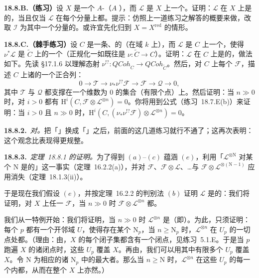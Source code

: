 \textbf{18.8.B.（练习）}\quad 设 $X$ 是一个\trProper{} $A$-\trScheme（$A$ \trNoetherian），而 $\mathscr{L}$ 是 $X$ 上一个\trInvertibleSheaf。证明：$\mathscr{L}$ 在 $X$ 上是\trAmple{}的，当且仅当 $\mathscr{L}$ 在每个分量上都\trAmple。提示：仿照上一道练习之解答的概要来做，改取 $\mathscr{I}$ 为其中一个分量的\trIdealSheaf。或许宜先化归到 $X=X^{\mathrm{red}}$ 的情形。

\textbf{18.8.C.（棘手练习）}\quad 设 $C$ 是一条\trProper{}、\emph{\trReduced}的\trCurve（在域 $k$ 上），而 $\mathscr{L}$ 是 $C$ 上一个\trLineBundle，使得 $\nu^*\mathscr{L}$ 是 $\widetilde{C}$ 上的一个\trAmple{}\trLineBundle（正规化一如既往是 $\nu\colon\widetilde{C}\to C$）。证明：$\mathscr{L}$ 在 $C$ 上是\trAmple{}的，做法如下。先读 \S17.1.6 以理解态射 $\nu^{!?}\colon\mathit{QCoh}_C\to\mathit{QCoh}_{\widetilde{C}}$。然后，对 $C$ 上每个\trQCSheaf{} $\mathscr{F}$，描述 $C$ 上诸\trQCSheaf{}的一个正合列：
\[
0\longrightarrow\mathscr{T}\longrightarrow\nu_*\nu^{!?}\mathscr{F}\longrightarrow\mathscr{F}\longrightarrow\mathscr{Q}\longrightarrow 0,
\]
其中 $\mathscr{T}$ 与 $\mathscr{Q}$ 都支撑在一个维数为 $0$ 的集合（有限个点）上。然后证明：当 $n\gg 0$ 时，对 $i>0$ 都有 $\mathrm{H}^i(C,\mathscr{F}\otimes\mathscr{L}^{\otimes n})=0$。你将用到\trProjection{}公式（\mbox{练习~18.7.E(b)}）来证明：当 $i>0$ 且 $n\gg 0$ 时，$\mathrm{H}^i(C,(\nu_*\nu^{!?}\mathscr{F})\otimes\mathscr{L}^{\otimes n})=0$。

\textbf{18.8.2.}\ \emph{\trVeryAmple{}对\trAmple。}\quad 把「\trAmple」换成「\trVeryAmple」之后，前面的这几道练习就行不通了；这再次表明：\trAmpleness{}这个观念比\trVeryAmpleness{}表现得更规整。

\textbf{18.8.3.}\ \emph{\mbox{定理~18.8.1} 的证明。}\quad 为了得到 $(a)$--$(c)$ 蕴涵 $(e)$，利用「$\mathscr{L}^{\otimes\mathrm{N}}$ 对某个 $\mathrm{N}$ 是\trVeryAmple{}的」这一事实（\mbox{定理~16.2.2(a)}），并对 $\mathscr{F}$、$\mathscr{F}\otimes\mathscr{L}$、\dots{}与 $\mathscr{F}\otimes\mathscr{L}^{\otimes(\mathrm{N}-1)}$ 应用\trSerre{}消失（\mbox{定理~18.1.3(ii)}）。

于是现在我们假设 $(e)$，并按\mbox{定理~16.2.2} 的判别法 $(b)$ 证明 $\mathscr{L}$ 是\trAmple{}的：我们将证明，对 $X$ 上任一\trCoherentSheaf{} $\mathscr{F}$，当 $n\gg 0$ 时 $\mathscr{F}\otimes\mathscr{L}^{\otimes n}$ 都\trGloballyGenerated。

我们从一特例开始：我们将证明，当 $n\gg 0$ 时 $\mathscr{L}^{\otimes n}$ 是\trGloballyGenerated（即\trBasePointFree）。为此，只须证明：每个\trClosedPoint{} $p$ 都有一个开邻域 $U$，使得存在某个 $\mathrm{N}_p$，当 $n\ge\mathrm{N}_p$ 时，$\mathscr{L}^{\otimes n}$ 在 $U_p$ 的一切点处都\trGloballyGenerated。（理由：由\trQuasicompactness，$X$ 的每个闭子集都含有一个闭点，见\mbox{练习~5.1.E}。于是当 $p$ 跑遍 $X$ 的诸闭点时，这些 $U_p$ 覆盖 $X$。再由\trQuasicompactness，我们可以用其中有限多个 $U_p$ 覆盖 $X$。令 $\mathrm{N}$ 为相应的诸 $\mathrm{N}_p$ 中的最大者。那么当 $n\ge\mathrm{N}$ 时，$\mathscr{L}^{\otimes n}$ 在这些 $U_p$ 的每一个内都\trGloballyGenerated，从而在整个 $X$ 上亦然。）

